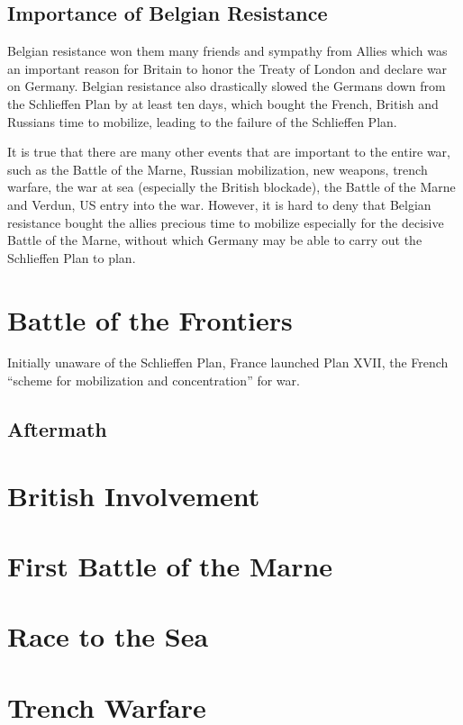 \documentclass[a4paper,numbers=endperiod,most,twoside,english,final,openany]{scrbook} %
\begin{document}
\section{Importance of Belgian Resistance}
Belgian resistance won them many friends and sympathy from Allies which was an important reason for Britain to honor the Treaty of London and declare war on Germany.  Belgian resistance also drastically slowed the Germans down from the Schlieffen Plan by at least ten days, which bought the French, British and Russians time to mobilize, leading to the failure of the Schlieffen Plan.

It is true that there are many other events that are important to the entire war, such as the Battle of the Marne, Russian mobilization, new weapons, trench warfare, the war at sea (especially the British blockade), the Battle of the Marne and Verdun, US entry into the war.  However, it is hard to deny that Belgian resistance bought the allies precious time to mobilize especially for the decisive Battle of the Marne, without which Germany may be able to carry out the Schlieffen Plan to plan.

\chapter{Battle of the Frontiers}

Initially unaware of the Schlieffen Plan, France launched Plan XVII, the French ``scheme for mobilization and concentration'' for war. 

\section{Aftermath}

\chapter{British Involvement}



\chapter{First Battle of the Marne}
\chapter{Race to the Sea}
\chapter{Trench Warfare}
\end{document}
